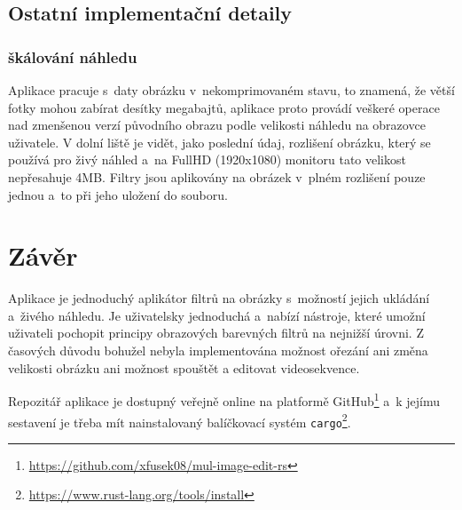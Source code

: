 \documentclass[11pt, a4paper, titlepage]{article}
\begin{document}
\subsection{Ostatní implementační detaily}
\subsubsection{škálování náhledu}
Aplikace pracuje s~daty obrázku v~nekomprimovaném stavu, to znamená, že větší fotky mohou zabírat desítky megabajtů, aplikace proto provádí veškeré operace nad zmenšenou verzí původního obrazu podle velikosti náhledu na obrazovce uživatele.
V dolní liště je vidět, jako poslední údaj, rozlišení obrázku, který se používá pro živý náhled a~na FullHD (1920x1080) monitoru tato velikost nepřesahuje 4MB.
Filtry jsou aplikovány na obrázek v~plném rozlišení pouze jednou a~to při jeho uložení do souboru.

\section{Závěr}
Aplikace je jednoduchý aplikátor filtrů na obrázky s~možností jejich ukládání a~živého náhledu.
Je uživatelsky jednoduchá a~nabízí nástroje, které umožní uživateli pochopit principy obrazových barevných filtrů na nejnižší úrovni. Z časových důvodu bohužel nebyla implementována možnost ořezání ani změna velikosti obrázku ani možnost spouštět a editovat videosekvence.

Repozitář aplikace je dostupný veřejně online na platformě GitHub\footnote{\url{https://github.com/xfusek08/mul-image-edit-rs}} a~k jejímu sestavení je třeba mít nainstalovaný balíčkovací systém \texttt{cargo}\footnote{\url{https://www.rust-lang.org/tools/install}}.


\begin{flushleft}
  
\end{flushleft}

\end{document}
